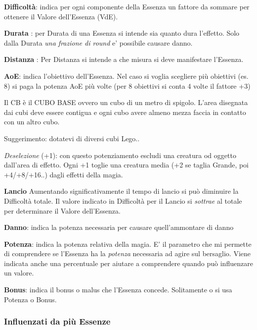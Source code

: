 \documentclass[a4paper,twoside,openany]{book}
\begin{document}
\begin{multicols}{2}

\textbf{Difficoltà}: indica per ogni componente della Essenza un fattore da sommare per ottenere il Valore dell'Essenza (VdE).

\textbf{Durata} : per Durata di una Essenza si intende sia quanto dura l'effetto.
Solo dalla Durata \emph{una frazione di round} e' possibile causare danno.

\textbf{Distanza} : Per Distanza si intende a che misura si deve manifestare l'Essenza.

\textbf{AoE}: indica l'obiettivo dell'Essenza. Nel caso si voglia scegliere più obiettivi (es. 8) si paga la potenza AoE più volte (per 8 obiettivi si conta 4 volte il fattore +3)

Il CB è il CUBO BASE ovvero un cubo di un metro di spigolo. L'area disegnata dai cubi deve essere contigua e ogni cubo avere almeno mezza faccia in contatto con un altro cubo.

Suggerimento: dotatevi di diversi cubi Lego..

\textit{Deselezione} (+1): con questo potenziamento escludi una creatura od oggetto dall'area di effetto. Ogni +1 toglie una creatura media (+2 se taglia Grande, poi +4/+8/+16..) dagli effetti della magia.

\textbf{Lancio}  
Aumentando significativamente il tempo di lancio  si può diminuire la Difficoltà totale. Il valore indicato in Difficoltà per il Lancio si \emph{sottrae} al totale per determinare il Valore dell'Essenza.

\textbf{Danno}: indica la potenza necessaria per causare quell'ammontare di danno

\textbf{Potenza}: indica la potenza relativa della magia. E' il parametro che mi permette di comprendere se l'Essenza ha la \emph{potenza} necessaria ad agire sul bersaglio. Viene indicata anche una percentuale per aiutare a comprendere quando può influenzare un valore.

\textbf{Bonus}: indica il bonus o malus che l'Essenza concede. Solitamente o si usa Potenza o Bonus.

\subsubsection{Influenzati da più Essenze}


\end{multicols}
\end{document}

